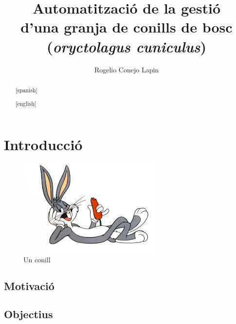 \documentclass[11pt,catalan,
               listoftables,listoffigures,listofalgorithms,listofquadres]
               {tfgetsinf}
\title{Automatització de la gestió \\
         d'una granja de conills de bosc\\ (\emph{oryctolagus cuniculus})}
\author{Rogelio Conejo Lapin}
\begin{document}

\begin{abstract}
\lipsum[1]
\end{abstract}
\begin{abstract}[spanish]
\lipsum[1]
\end{abstract}
\begin{abstract}[english]
\lipsum[1]
\end{abstract}


\mainmatter

\chapter{Introducci\'o}

\lipsum[2]
\begin{figure}
\centering
\includegraphics[scale=0.75]{bugs}
\caption{Un conill}\label{fig:bugs}
\end{figure}
\lipsum[3]
\lipsum[4]

\section{Motivaci\'o}

\lipsum[5]

\section{Objectius}
\end{document}
